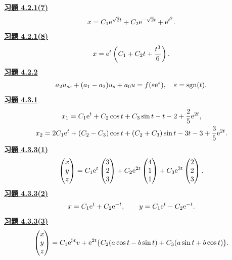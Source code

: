 \noindent\textbf{\hyperref[q:4.2.1(7)]{习题 4.2.1(7)}}
\[\begin{gathered}x=C_1\mathrm e^{\sqrt2t}+C_2\mathrm e^{-\sqrt2t}+\mathrm e^{t^2}.\end{gathered}\]
\noindent\textbf{\hyperref[q:4.2.1(8)]{习题 4.2.1(8)}}
\[\begin{gathered}x=\mathrm e^t\left(C_1+C_2t+\dfrac{t^3}{6}\right).\end{gathered}\]
\noindent\textbf{\hyperref[q:4.2.2]{习题 4.2.2}}
\[\begin{gathered}a_2u_{ss}+(a_1-a_2)u_s+a_0u=f(\varepsilon\mathrm e^s),\quad
\varepsilon=\operatorname{sgn}(t).\end{gathered}\]
\noindent\textbf{\hyperref[q:4.3.1]{习题 4.3.1}}
\[\begin{gathered}x_1=C_1\mathrm e^t+C_2\cos t+C_3\sin t-t-2+\dfrac25\mathrm e^{2t},\\
x_2=2C_1\mathrm e^t+(C_2-C_3)\cos t+(C_2+C_3)\sin t-3t-3+\dfrac35\mathrm e^{2t}.\end{gathered}\]
\noindent\textbf{\hyperref[q:4.3.3(1)]{习题 4.3.3(1)}}
\[\begin{gathered}\begin{pmatrix}x\\y\\z\end{pmatrix}
=C_1\mathrm e^t\begin{pmatrix}3\\2\\3\end{pmatrix}
+C_2\mathrm e^{2t}\begin{pmatrix}4\\1\\1\end{pmatrix}
+C_3\mathrm e^{3t}\begin{pmatrix}2\\2\\3\end{pmatrix}.\end{gathered}\]
\noindent\textbf{\hyperref[q:4.3.3(2)]{习题 4.3.3(2)}}
\[\begin{gathered}x=C_1\mathrm e^t+C_2\mathrm e^{-t},\qquad y=C_1\mathrm e^t-C_2\mathrm e^{-t}.\end{gathered}\]
\noindent\textbf{\hyperref[q:4.3.3(3)]{习题 4.3.3(3)}}
\[\begin{gathered}\begin{pmatrix}x\\y\\z\end{pmatrix}=C_1\mathrm e^{5t}v+
\mathrm e^{2t}\{C_2(a\cos t-b\sin t)+C_3(a\sin t+b\cos t)\}.\end{gathered}\]
